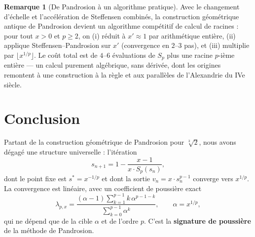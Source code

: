 \documentclass[11pt,a4paper]{article}
\theoremstyle{definition}
\newtheorem{remark}{Remarque}[section]
\newcommand{\cbrt}[1]{\sqrt[3]{#1}}
\begin{document}
\begin{remark}[De Pandrosion à un algorithme pratique]
Avec le changement d'échelle et l'accélération de Steffensen combinés, la construction géométrique antique de Pandrosion devient un algorithme compétitif de calcul de racines : pour tout $x > 0$ et $p \geq 2$, on (i) réduit à $x' \approx 1$ par arithmétique entière, (ii) applique Steffensen--Pandrosion sur $x'$ (convergence en $2$--$3$ pas), et (iii) multiplie par $\lfloor x^{1/p} \rfloor$. Le coût total est de $4$--$6$ évaluations de $S_p$ plus une racine $p$-ième entière --- un calcul purement algébrique, sans dérivée, dont les origines remontent à une construction à la règle et aux parallèles de l'Alexandrie du IVe siècle.
\end{remark}

\section{Conclusion}
\label{sec:conclusion}

Partant de la construction géométrique de Pandrosion pour $\cbrt{2}$, nous avons dégagé une structure universelle : l'itération
\[
  s_{n+1} = 1 - \frac{x-1}{x \cdot S_p(s_n)},
\]
dont le point fixe est $s^* = x^{-1/p}$ et dont la sortie $v_n = x \cdot s_n^{p-1}$ converge vers $x^{1/p}$. La convergence est linéaire, avec un coefficient de poussière exact
\[
  \lambda_{p,x} = \frac{(\alpha-1)\displaystyle\sum_{k=1}^{p-1} k\,\alpha^{p-1-k}}{\displaystyle\sum_{k=0}^{p-1}\alpha^k}, \qquad \alpha = x^{1/p},
\]
qui ne dépend que de la cible $\alpha$ et de l'ordre $p$. C'est la \textbf{signature de poussière} de la méthode de Pandrosion.

\medskip
\end{document}
